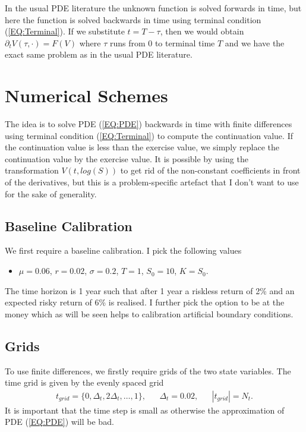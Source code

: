 \documentclass[11pt,a4paper]{article}
\begin{document}
In the usual PDE literature the unknown function is solved forwards in time, but here the function is solved backwards in time using terminal condition (\ref{EQ:Terminal}). If we substitute $t = T-\tau$, then we would obtain $\partial_{t}V(\tau,\cdot) = F(V)$ where $\tau$ runs from 0 to terminal time $T$ and we have the exact same problem as in the usual PDE literature.

\section{Numerical Schemes}

The idea is to solve PDE (\ref{EQ:PDE}) backwards in time with finite differences using terminal condition (\ref{EQ:Terminal}) to compute the continuation value. If the continuation value is less than the exercise value, we simply replace the continuation value by the exercise value. It is possible by using the transformation $V(t,log(S))$ to get rid of the non-constant coefficients in front of the derivatives, but this is a problem-specific artefact that I don't want to use for the sake of generality.

\subsection{Baseline Calibration}
We first require a baseline calibration. I pick the following values
\begin{itemize}
\item $\mu=0.06$, $r=0.02$, $\sigma=0.2$, $T=1$, $S_0 = 10$, $K=S_0$.
\end{itemize}
The time horizon is 1 year such that after 1 year a riskless return of 2\% and an expected risky return of 6\% is realised. I further pick the option to be at the money which as will be seen helps to calibration artificial boundary conditions.  

\subsection{Grids}
To use finite differences, we firstly require grids of the two state variables. The time grid is given by the evenly spaced grid
\begin{align*}
t_{grid} = \{0,\Delta_t, 2\Delta_t, \ldots,1\}, && \Delta_t = 0.02, && |t_{grid}| = N_t.
\end{align*}
It is important that the time step is small as otherwise the approximation of PDE (\ref{EQ:PDE}) will be bad. 
 
\end{document}
